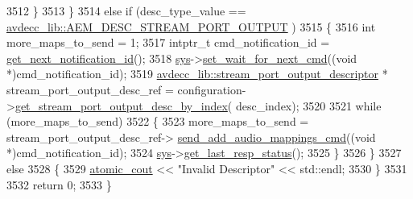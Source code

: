 \begin{DoxyCode}
3512         \}
3513     \}
3514     \textcolor{keywordflow}{else} \textcolor{keywordflow}{if} (desc\_type\_value == \hyperlink{namespaceavdecc__lib_ac7b7d227e46bc72b63ee9e9aae15902fa2b2dca37bb2c945a2b37b02231650b48}{avdecc\_lib::AEM\_DESC\_STREAM\_PORT\_OUTPUT}
      )
3515     \{
3516         \textcolor{keywordtype}{int} more\_maps\_to\_send = 1;
3517         intptr\_t cmd\_notification\_id = \hyperlink{classcmd__line_a57486218387d1aa9d262eb7c176154ad}{get\_next\_notification\_id}();
3518         \hyperlink{classcmd__line_a485db4800e331cb4052c447fdf5d154e}{sys}->\hyperlink{classavdecc__lib_1_1system_a26b769584f10225077da47583edda33e}{set\_wait\_for\_next\_cmd}((\textcolor{keywordtype}{void} *)cmd\_notification\_id);
3519         \hyperlink{classavdecc__lib_1_1stream__port__output__descriptor}{avdecc\_lib::stream\_port\_output\_descriptor} * 
      stream\_port\_output\_desc\_ref = configuration->\hyperlink{classavdecc__lib_1_1configuration__descriptor_afc0e79843f9b98263f9be9d16197310b}{get\_stream\_port\_output\_desc\_by\_index}(
      desc\_index);
3520 
3521         \textcolor{keywordflow}{while} (more\_maps\_to\_send)
3522         \{
3523             more\_maps\_to\_send = stream\_port\_output\_desc\_ref->
      \hyperlink{classavdecc__lib_1_1stream__port__output__descriptor_a5d94b5190eaba5a650afd90d6e483d72}{send\_add\_audio\_mappings\_cmd}((\textcolor{keywordtype}{void} *)cmd\_notification\_id);
3524             \hyperlink{classcmd__line_a485db4800e331cb4052c447fdf5d154e}{sys}->\hyperlink{classavdecc__lib_1_1system_aa63e8d1a4e51f695cdcccc9340922407}{get\_last\_resp\_status}();
3525         \}
3526     \}
3527     \textcolor{keywordflow}{else}
3528     \{
3529         \hyperlink{cmd__line_8h_a0bc38ccc65c79ba06c6fcd7b4bf554c3}{atomic\_cout} << \textcolor{stringliteral}{"Invalid Descriptor"} << std::endl;
3530     \}
3531 
3532     \textcolor{keywordflow}{return} 0;
3533 \}
\end{DoxyCode}


